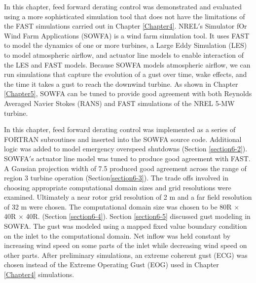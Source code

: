 In this chapter, feed forward derating control was demonstrated and evaluated using a more sophisticated simulation tool that does not have the limitations of the FAST simulations carried out in Chapter \ref{Chapter4}. NREL$'$s Simulator fOr Wind Farm Applications (SOWFA) is a wind farm simulation tool. It uses FAST to model the dynamics of one or more turbines, a Large Eddy Simulation (LES) to model atmospheric airflow, and actuator line models to enable interaction of the LES and FAST models. Because SOWFA models atmospheric airflow, we can run simulations that capture the evolution of a gust over time, wake effects, and the time it takes a gust to reach the downwind turbine. As shown in Chapter \ref{Chapter5}, SOWFA can be tuned to provide good agreement with both Reynolds Averaged Navier Stokes (RANS) and FAST simulations of the NREL 5-MW turbine. 

In this chapter, feed forward derating control was implemented as a series of FORTRAN subroutines and inserted into the SOWFA source code. Additional logic was added to model emergency overspeed shutdowns (Section \ref{section6-2}). SOWFA$'$s actuator line model was tuned to produce good agreement with FAST. A Gausian projection width of 7.5 produced good agreement across the range of region 3 turbine operation (Section\ref{section6-3}). The trade offs involved in choosing appropriate computational domain sizes and grid resolutions were examined. Ultimately a near rotor grid resolution of 2 m and a far field resolution of 32 m were chosen. The computational domain size was chosen to be 80R $\times$ 40R $\times$ 40R. (Section \ref{section6-4}). Section \ref{section6-5} discussed gust modeling in SOWFA. The gust was modeled using a mapped fixed value boundary condition on the inlet to the computational domain. Net inflow was held constant by increasing wind speed on some parts of the inlet while decreasing wind speed on other parts. After preliminary simulations, an extreme coherent gust (ECG) was chosen instead of the Extreme Operating Gust (EOG) used in Chapter \ref{Chapter4} simulations.

